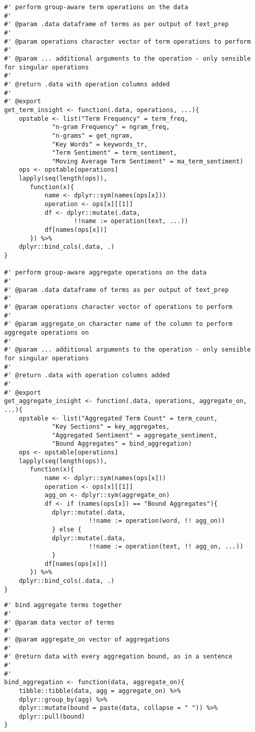 \documentclass[a4paper, 11pt]{article}
\begin{document}
\begin{verbatim}
#' perform group-aware term operations on the data
#'
#' @param .data dataframe of terms as per output of text_prep
#'
#' @param operations character vector of term operations to perform
#'
#' @param ... additional arguments to the operation - only sensible for singular operations 
#'
#' @return .data with operation columns added
#'
#' @export
get_term_insight <- function(.data, operations, ...){
    opstable <- list("Term Frequency" = term_freq,
		     "n-gram Frequency" = ngram_freq,
		     "n-grams" = get_ngram,
		     "Key Words" = keywords_tr,
		     "Term Sentiment" = term_sentiment,
		     "Moving Average Term Sentiment" = ma_term_sentiment)
    ops <- opstable[operations]
    lapply(seq(length(ops)),
	   function(x){
	       name <- dplyr::sym(names(ops[x]))
	       operation <- ops[x][[1]]
	       df <- dplyr::mutate(.data,
				   !!name := operation(text, ...))
	       df[names(ops[x])]
	   }) %>%
	dplyr::bind_cols(.data, .)
}

#' perform group-aware aggregate operations on the data
#'
#' @param .data dataframe of terms as per output of text_prep
#'
#' @param operations character vector of operations to perform
#'
#' @param aggregate_on character name of the column to perform aggregate operations on
#'
#' @param ... additional arguments to the operation - only sensible for singular operations 
#'
#' @return .data with operation columns added
#'
#' @export
get_aggregate_insight <- function(.data, operations, aggregate_on, ...){
    opstable <- list("Aggregated Term Count" = term_count,
		     "Key Sections" = key_aggregates,
		     "Aggregated Sentiment" = aggregate_sentiment,
		     "Bound Aggregates" = bind_aggregation)
    ops <- opstable[operations]
    lapply(seq(length(ops)),
	   function(x){
	       name <- dplyr::sym(names(ops[x]))
	       operation <- ops[x][[1]]
	       agg_on <- dplyr::sym(aggregate_on)
	       df <- if (names(ops[x]) == "Bound Aggregates"){
			 dplyr::mutate(.data,
				       !!name := operation(word, !! agg_on))
		     } else {
			 dplyr::mutate(.data,
				       !!name := operation(text, !! agg_on, ...))
		     }
	       df[names(ops[x])]
	   }) %>%
	dplyr::bind_cols(.data, .)
}
\end{verbatim}

\begin{verbatim}
#' bind aggregate terms together
#'
#' @param data vector of terms
#'
#' @param aggregate_on vector of aggregations
#'
#' @return data with every aggregation bound, as in a sentence
#'
#'
bind_aggregation <- function(data, aggregate_on){
    tibble::tibble(data, agg = aggregate_on) %>%
	dplyr::group_by(agg) %>%
	dplyr::mutate(bound = paste(data, collapse = " ")) %>%
	dplyr::pull(bound)
}
\end{verbatim}
\end{document}
